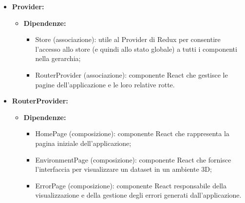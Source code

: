 \begin{itemize}
    \item \textbf{Provider:}
          \begin{itemize}
              \item \textbf{Dipendenze:}
                    \begin{itemize}
                        \item Store (associazione): utile al Provider di Redux per consentire l'accesso allo
                              store (e quindi allo stato globale) a tutti i componenti nella gerarchia;
                        \item RouterProvider (associazione): componente React che gestisce le pagine
                              dell'applicazione e le loro relative rotte.
                    \end{itemize}
          \end{itemize}

    \item \textbf{RouterProvider:}
          \begin{itemize}
              \item \textbf{Dipendenze:}
                    \begin{itemize}
                        \item HomePage (composizione): componente React che rappresenta la pagina iniziale
                              dell'applicazione;
                        \item EnvironmentPage (composizione): componente React che fornisce l'interfaccia per
                              visualizzare un dataset in un ambiente 3D;
                        \item ErrorPage (composizione): componente React responsabile della visualizzazione e
                              della gestione degli errori generati dall'applicazione.
                    \end{itemize}
          \end{itemize}
\end{itemize}

\pagebreak

